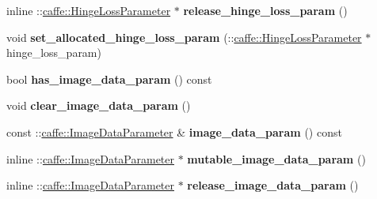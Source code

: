 \begin{DoxyCompactItemize}
\item 
\mbox{\label{classcaffe_1_1_v1_layer_parameter_af96ec58494c500647c99eb6f96a89a6b}} 
inline \+::\mbox{\hyperlink{classcaffe_1_1_hinge_loss_parameter}{caffe\+::\+Hinge\+Loss\+Parameter}} $\ast$ {\bfseries release\+\_\+hinge\+\_\+loss\+\_\+param} ()
\item 
\mbox{\label{classcaffe_1_1_v1_layer_parameter_a8e48abc55f1f5831b63518bdc374aea0}} 
void {\bfseries set\+\_\+allocated\+\_\+hinge\+\_\+loss\+\_\+param} (\+::\mbox{\hyperlink{classcaffe_1_1_hinge_loss_parameter}{caffe\+::\+Hinge\+Loss\+Parameter}} $\ast$hinge\+\_\+loss\+\_\+param)
\item 
\mbox{\label{classcaffe_1_1_v1_layer_parameter_a266ccfcd34a511564a06727424307f6f}} 
bool {\bfseries has\+\_\+image\+\_\+data\+\_\+param} () const
\item 
\mbox{\label{classcaffe_1_1_v1_layer_parameter_a32dc65ac01d96eeb734d936271fc99ba}} 
void {\bfseries clear\+\_\+image\+\_\+data\+\_\+param} ()
\item 
\mbox{\label{classcaffe_1_1_v1_layer_parameter_a5af8f43ca7246a58342450b4cbc77e43}} 
const \+::\mbox{\hyperlink{classcaffe_1_1_image_data_parameter}{caffe\+::\+Image\+Data\+Parameter}} \& {\bfseries image\+\_\+data\+\_\+param} () const
\item 
\mbox{\label{classcaffe_1_1_v1_layer_parameter_a5bd4112da6083913e818139feeeb944d}} 
inline \+::\mbox{\hyperlink{classcaffe_1_1_image_data_parameter}{caffe\+::\+Image\+Data\+Parameter}} $\ast$ {\bfseries mutable\+\_\+image\+\_\+data\+\_\+param} ()
\item 
\mbox{\label{classcaffe_1_1_v1_layer_parameter_a663e4b9cc763cfe4c5fef549708be4bb}} 
inline \+::\mbox{\hyperlink{classcaffe_1_1_image_data_parameter}{caffe\+::\+Image\+Data\+Parameter}} $\ast$ {\bfseries release\+\_\+image\+\_\+data\+\_\+param} ()
\item 
\mbox{\label{classcaffe_1_1_v1_layer_parameter_a7f0d3f28ef5296013327cfac0040d099}} 

\end{DoxyCompactItemize}

